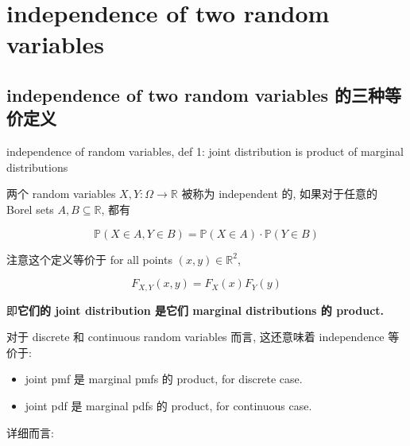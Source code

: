 \documentclass{qlnotes-export}
\begin{document}
\section{independence of two random variables}\label{independence-of-two-random-variables}

\subsection{independence of two random variables 的三种等价定义}\label{independence-of-two-random-variables-ux7684ux4e09ux79cdux7b49ux4ef7ux5b9aux4e49}

\begin{definition}{independence of random variables, def 1: joint distribution is product
of marginal distributions}\label{def-03-joint-conditional-distribution-independence-of-random-variables-def-1-joint-distribution-is-pro}

两个 random variables \(X,Y:\Omega\rightarrow{\mathbb{R}}\) 被称为 independent 的, 如果对于任意的 Borel sets \(A,B \subseteq {\mathbb{R}}\), 都有

\[{\mathbb{P}}(X \in A,Y \in B) = {\mathbb{P}}(X \in A) \cdot {\mathbb{P}}(Y \in B)\]

注意这个定义等价于 for all points \((x,y) \in {\mathbb{R}}^{2}\),

\[F_{X,Y}(x,y) = F_{X}(x)F_{Y}(y)\]

即\textbf{它们的 joint distribution 是它们 marginal distributions 的 product.}

\end{definition}

对于 discrete 和 continuous random variables 而言, 这还意味着 independence 等价于:

\begin{itemize}
\item
  joint pmf 是 marginal pmfs 的 product, for discrete case.
\item
  joint pdf 是 marginal pdfs 的 product, for continuous case.
\end{itemize}

详细而言:
\end{document}

